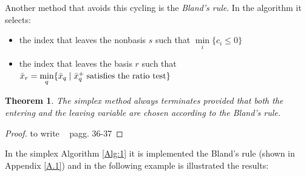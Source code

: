\documentclass[a4paper,10 pt,titlepage,twoside]{book}
\theoremstyle{plain}
\newtheorem*{theorem*}{Theorem}
\theoremstyle{definition}
\theoremstyle{remark}
\begin{document}
Another method that avoids this cycling is the \textit{Bland's rule}. In the algorithm it selects:
\begin{itemize}
	\item the index that leaves the nonbasis $s$ such that $\min\limits_{i}\{c_{i}\leq0\}$
\item the index that leaves the basis $r$ such that $\bar{x}_{r} = \min\limits_{q}\{\bar{x}_{q}\;|\;\bar{x}_{q}^{+} \text{\;satisfies the ratio test} \}$ \end{itemize} 
\begin{theorem*}
	The simplex method always terminates provided that both the entering and the leaving variable are chosen according to the Bland's rule.
\end{theorem*}
\begin{proof}
to write ~\cite{LP} pagg. 36-37	
\end{proof}
In the simplex Algorithm \ref{Alg:1} it is implemented the Bland's rule (shown in Appendix \ref{A.1}) and in the following example is illustrated the results:
\end{document}
